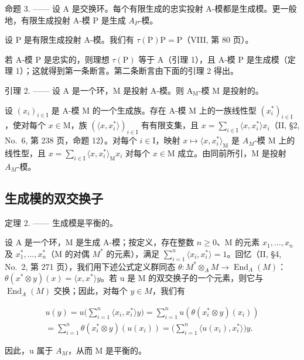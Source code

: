 命题 3. —— 设 A 是交换环。每个有限生成的忠实投射 A-模都是生成模。更一般地，有限生成投射 A-模 P 是生成 \(A_{P}\)-模。

设 P 是有限生成投射 A-模。我们有 \(\tau(\mathrm{P})\mathrm{P}=\mathrm{P}\)（VIII, 第 80 页）。

若 A-模 P 是忠实的，则理想 \(\tau(\mathrm{P})\) 等于 A（引理 1），且 A-模 P 是生成模（定理 1）；这就得到第一条断言。第二条断言由下面的引理 2 得出。

引理 2. —— 设 A 是一个环，M 是投射 A-模。则 \(\mathrm{A_M}\)-模 M 是投射的。

设 \((x_{i})_{i\in\mathrm{I}}\) 是 A-模 M 的一个生成族。存在 A-模 M 上的一族线性型 \((x_{i}^{*})_{i\in\mathrm{I}}\)，使对每个 \(x\in\mathrm{M}\)，族 \((\langle x,x_{i}^{*}\rangle)_{i\in\mathrm{I}}\) 有有限支集，且 \(x=\sum_{i\in\mathrm{I}}\langle x,x_{i}^{*}\rangle x_{i}\)（II, §2, No.~6, 第 238 页，命题 12）。对每个 \(i\in\mathrm{I}\)，映射 \(x\mapsto\langle x,x_{i}^{*}\rangle_{\mathrm{M}}\) 是 \(A_{M}\)-模 M 上的线性型，且 \(x=\sum_{i\in\mathrm{I}}\langle x,x_{i}^{*}\rangle_{\mathrm{M}}x_{i}\) 对每个 \(x\in\mathrm{M}\) 成立。由同前所引，M 是投射 \(A_{M}\)-模。

\subsection{生成模的双交换子}

定理 2. —— 生成模是平衡的。

设 A 是一个环，M 是生成 A-模；按定义，存在整数 \(n \geqslant 0\)、M 的元素 \(x_{1}, \ldots, x_{n}\) 及 \(x_{1}^{*}, \ldots, x_{n}^{*}\)（M 的对偶 \(M^{*}\) 的元素），满足 \(\sum_{i=1}^{n} \langle x_{i}, x_{i}^{*} \rangle = 1\)。回忆（II, §4, No.~2, 第 271 页），我们用下述公式定义群同态 \(\theta : M^{*} \otimes_{A} M \to \operatorname{End}_{A}(M)\)：\(\theta(x^{*} \otimes y)(x) = \langle x, x^{*} \rangle y\)。若 u 是 M 的双交换子的一个元素，则它与 \(\operatorname{End}_{A}(M)\) 交换；因此，对每个 \(y \in M\)，我们有

\[
\begin{array}{l} u (y) = u \Big (\sum_ {i = 1} ^ {n} \langle x _ {i}, x _ {i} ^ {*} \rangle y \Big) = \sum_ {i = 1} ^ {n} u (\theta (x _ {i} ^ {*} \otimes y) (x _ {i})) \\ = \sum_ {i = 1} ^ {n} \theta (x _ {i} ^ {*} \otimes y) (u (x _ {i})) = \Big (\sum_ {i = 1} ^ {n} \langle u (x _ {i}), x _ {i} ^ {*} \rangle \Big) y. \end{array}
\]

因此，u 属于 \(A_{M}\)，从而 M 是平衡的。

